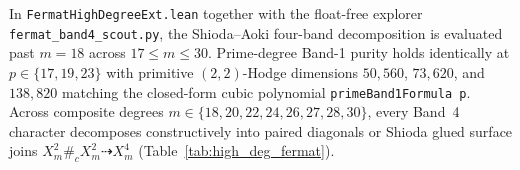 \documentclass[11pt,a4paper]{article}
\begin{document}
In \texttt{FermatHighDegreeExt.lean} together with the float-free explorer \texttt{fermat\_band4\_scout.py}, the Shioda--Aoki four-band decomposition is evaluated past $m = 18$ across $17 \le m \le 30$. Prime-degree Band-1 purity holds identically at $p \in \{17, 19, 23\}$ with primitive $(2,2)$-Hodge dimensions $50{,}560$, $73{,}620$, and $138{,}820$ matching the closed-form cubic polynomial \texttt{primeBand1Formula p}. Across composite degrees $m \in \{18, 20, 22, 24, 26, 27, 28, 30\}$, every Band~4 character decomposes constructively into paired diagonals or Shioda glued surface joins $X_m^2 \#_c X_m^2 \dashrightarrow X_m^4$ (Table~\ref{tab:high_deg_fermat}).

\begin{table}[htbp]
  \centering
  \caption{High-degree Fermat fourfold $(2,2)$-Hodge census across $17 \le m \le 30$ (kernel-certified through $m \le 25$, extended through $m = 30$ via exact integer orbit weights).}
  \label{tab:high_deg_fermat}
\end{table}
\end{document}
